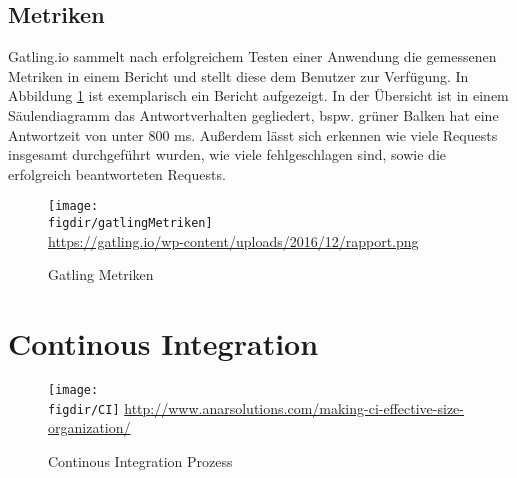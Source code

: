 \subsection{Metriken}

Gatling.io sammelt nach erfolgreichem Testen einer Anwendung die gemessenen Metriken in einem Bericht und stellt diese dem Benutzer zur Verfügung. In Abbildung \ref{fig:gatlingMetriken} ist exemplarisch ein Bericht aufgezeigt. In der Übersicht ist in einem Säulendiagramm das Antwortverhalten gegliedert, bspw. grüner Balken hat eine Antwortzeit von unter 800 ms. Außerdem lässt sich erkennen wie viele Requests insgesamt durchgeführt wurden, wie viele fehlgeschlagen sind, sowie die erfolgreich beantworteten Requests.
\begin{figure}
	{\caption{Gatling Metriken}
		\label{fig:gatlingMetriken}}
	{\texttt{[image: \\figdir/gatlingMetriken]}}\\
	\tiny{\quelle\url{https://gatling.io/wp-content/uploads/2016/12/rapport.png}}
\end{figure}



\section{Continous Integration}

\begin{figure}
	{\caption{Continous Integration Prozess}
		\label{fig:continousIntegration}}
	{\texttt{[image: \\figdir/CI]}}
	\tiny{\quelle\url{http://www.anarsolutions.com/making-ci-effective-size-organization/}}
\end{figure}

